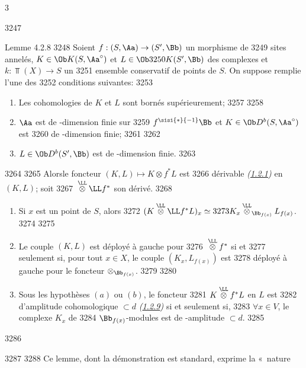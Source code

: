 3	\documentclass[10pt]{../fichiers-configuration-latex/smfart}
\begin{document}
  3247	\begin{enonce*}{Lemme 4.2.8}
  3248	Soient $f:(S,\Aa)\rightarrow (S',\Bb)$ un morphisme de
  3249	sites annelés, $K\in \Ob K(S,\Aa^{\circ})$ et $L\in \Ob
  3250	K(S',\Bb)$ des complexes et $k:\Top(X)\rightarrow S$ un
  3251	ensemble conservatif de points de $S$. On suppose remplie l'une des
  3252	conditions suivantes:
  3253	\begin{enumerate}
  3254	\renewcommand{\theenumi}{\alph{enumi}}
  3255	\renewcommand{\labelenumi}{(\theenumi)}
  3256	\item Les cohomologies de $K$ et $L$ sont bornés supérieurement;
  3257	
  3258	\item $\Aa$ est de \tTor-dimension finie sur
  3259	$f^{\sisi{\ast}{-1}}\Bb$ et $K\in \Ob D^{b}(S,\Aa^{\circ})$ est
  3260	de \tTor-dimension finie;
  3261	
  3262	\item $L\in \Ob D^{b}(S',\Bb)$ est de \tTor-dimension finie.
  3263	\end{enumerate}
  3264	
  3265	Alors\pageoriginale le foncteur $(K,L)\mapsto K\otimes f^{\ast}L$ est
  3266	dérivable \emph{(\hyperref[XVII.def1.2.1]{1.2.1})} en $(K,L)$; soit
  3267	${}\overset{\LL}{\otimes}\LL f^{\ast}$ son dérivé.
  3268	\begin{enumerate}
  3269	\renewcommand{\theenumi}{\roman{enumi}}
  3270	\renewcommand{\labelenumi}{(\theenumi)}
  3271	\item Si $x$ est un point de $S$, alors
  3272	$(K\overset{\LL}{\otimes}\LL f^{\ast}L)_x\simeq
  3273	K_x\overset{\LL}{\otimes}_{\Bb_{f(x)}}L_{f(x)}$.
  3274	
  3275	\item Le couple $(K,L)$ est déployé à gauche pour
  3276	${}\overset{\LL}{\otimes} f^{\ast}$  si et
  3277	seulement si, pour tout $x\in X$, le couple $(K_x,L_{f(x)})$ est
  3278	déployé à gauche pour le foncteur $\otimes_{\Bb_{f(x)}}$.
  3279	
  3280	\item Sous les hypothèses $(a)$ ou $(b)$, le foncteur
  3281	$K\overset{\LL}{\otimes} f^{\ast}L$ en $L$ est
  3282	d'amplitude cohomologique $\subset d$ \emph{(\hyperref[XVII.def1.2.9]{1.2.9})} si et seulement si,
  3283	$\forall x \in V$, le complexe $K_x$ de
  3284	$\Bb_{f(x)}$-modules est de \tTor-amplitude $\subset d$.
  3285	\end{enumerate}
  3286	\end{enonce*}
  3287	
  3288	Ce lemme, dont la démonstration est standard, exprime la « nature
\end{document}
